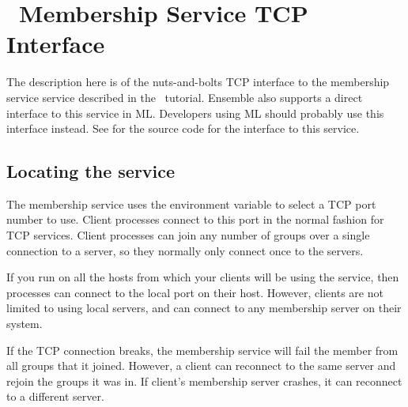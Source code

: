 %
%
%
\newenvironment{FormatTable}{%
\begin{quote}\begin{tabular}{|l|l|} \hline
}{\end{tabular}\end{quote}
}
\newcommand {\formatentry}[2]	{#1 & #2 \\ \hline}

\section{\ensemble\ Membership Service TCP Interface}
\label{section:memership}


The description here is of the nuts-and-bolts TCP interface to the
 membership service service described in the
\ensemble\ tutorial.  Ensemble also supports a direct interface to
this service in ML.  Developers using ML should probably use this
interface instead.  See  for the source
code for the interface to this service.

\subsection{Locating the service}
The membership service uses the environment variable
 to select a TCP port number to use.  Client
processes connect to this port in the normal fashion for TCP
services.  Client processes can join any number of groups over a
single connection to a server, so they normally only connect once to
the servers.

If you run  on all the hosts from which your clients
will be using the service, then processes can connect to the local
port on their host.  However, clients are not limited to using local
servers, and can connect to any membership server on their system.

If the TCP connection breaks, the membership service will fail the
member from all groups that it joined.  However, a client can
reconnect to the same server and rejoin the groups it was in.  If
client's membership server crashes, it can reconnect to a different
server.

